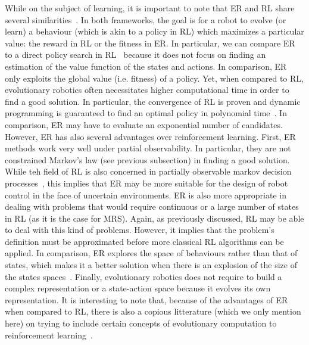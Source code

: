     While on the subject of learning, it is important to note that ER and RL share several similarities~\parencite{Whiteson2012, Doncieux2015a}. In both frameworks, the goal is for a robot to evolve (or learn) a behaviour (which is akin to a policy in RL) which maximizes a particular value: the reward in RL or the fitness in ER. In particular, we can compare ER to a direct policy search in RL~\parencite{Kober2013} because it does not focus on finding an estimation of the value function of the states and actions. In comparison, ER only exploits the global value (i.e. fitness) of a policy. Yet, when compared to RL, evolutionary robotics often necessitates higher computational time in order to find a good solution. In particular, the convergence of RL is proven and dynamic programming is guaranteed to find an optimal policy in polynomial time~\parencite{Littman1994, Whiteson2012}. In comparison, ER may have to evaluate an exponential number of candidates. However, ER has also several advantages over reinforcement learning. First, ER methods work very well under partial observability. In particular, they are not constrained Markov's law (see previous subsection) in finding a good solution. While teh field of RL is also concerned in partially observable markov decision processes~\parencite{Jaakkola1994}, this implies that ER may be more suitable for the design of robot control in the face of uncertain environments. ER is also more appropriate in dealing with problems that would require continuous or a large number of states in RL (as it is the case for MRS). Again, as previously discussed, RL may be able to deal with this kind of problems. However, it implies that the problem's definition must be approximated before more classical RL algorithms can be applied. In comparison, ER explores the space of behaviours rather than that of states, which makes it a better solution when there is an explosion of the size of the states spaces~\parencite{Panait2005}. Finally, evolutionary robotics does not require to build a complex representation or a state-action space because it evolves its own representation. It is interesting to note that, because of the advantages of ER when compared to RL, there is also a copious litterature (which we only mention here) on trying to include certain concepts of evolutionary computation to reinforcement learning~\parencite{Whiteson2012}.

